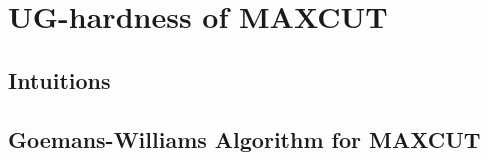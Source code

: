 \section{UG-hardness of MAXCUT}
\subsection{Intuitions}
\subsection{Goemans-Williams Algorithm for MAXCUT}
